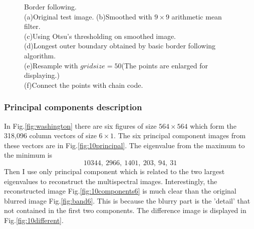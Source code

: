 \begin{figure}[h!]
	\caption{Border following.\\ (a)Original test image. (b)Smoothed with $9\times 9$ arithmetic mean filter.\\(c)Using Otsu's thresholding on smoothed image.\\ (d)Longest outer boundary obtained by basic border following algorithm.\\(e)Resample with $gridsize=50$(The points are enlarged for displaying.) \\(f)Connect the points with chain code.}
	\label{fig:borderfollow}
\end{figure}

\subsubsection{Principal components description}
In Fig.\ref{fig:washington} there are six figures of size $564\times 564$ which form the 318,096 column vectors of size $6\times 1$. The six principal component images from these vectors are in Fig.\ref{fig:10principal}. The eigenvalue from the maximum to the minimum is \begin{equation} 10344, ~2966, ~1401, ~203, ~94, ~31 \end{equation} Then I use only principal component which is related to the two largest eigenvalues to reconstruct the multispectral images. Interestingly, the reconstructed image Fig.\ref{fig:10components6} is much clear than the original blurred image Fig.\ref{fig:band6}. This is because the blurry part is the 'detail' that not contained in the first two components. The difference image is displayed in Fig.\ref{fig:10different}.

